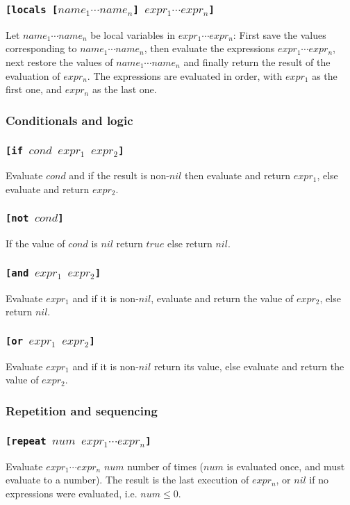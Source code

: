 \documentclass[11pt]{report}
\begin{document}
\subsubsection*{\tt{[locals [}$name_1 \cdots name_n$\tt{]} $expr_1 \cdots expr_n$\tt{]}}
Let $name_1 \cdots name_n$ be local variables in $expr_1 \cdots expr_n$: First save the values corresponding to $name_1 \cdots name_n$, then evaluate the expressions $expr_1 \cdots expr_n$, next restore the values of $name_1 \cdots name_n$ and finally return the result of the evaluation of $expr_n$. The expressions are evaluated in order, with $expr_1$ as the first one, and $expr_n$ as the last one.

\subsubsection{Conditionals and logic}
\subsubsection*{\tt{[if }$cond$ $expr_1$ $expr_2$\tt{]}}
Evaluate $cond$ and if the result is non-$nil$ then evaluate and return $expr_1$, else evaluate and return $expr_2$.

\subsubsection*{\tt{[not }$cond$\tt{]}}
If the value of $cond$ is $nil$ return $true$ else return $nil$.

\subsubsection*{\tt{[and }$expr_1$ $expr_2$\tt{]}}
Evaluate $expr_1$ and if it is non-$nil$, evaluate and return the value of $expr_2$, else return $nil$.

\subsubsection*{\tt{[or }$expr_1$ $expr_2$\tt{]}}
Evaluate $expr_1$ and if it is non-$nil$ return its value, else evaluate and return the value of $expr_2$.

\subsubsection{Repetition and sequencing}
\subsubsection*{\tt{[repeat }$num$ $expr_1 \cdots expr_n$\tt{]}}
Evaluate $expr_1 \cdots expr_n$ $num$ number of times ($num$ is evaluated once, and must evaluate to a number). The result is the last execution of $expr_n$, or $nil$ if no expressions were evaluated, i.e. $num \leq 0$.
\end{document}
